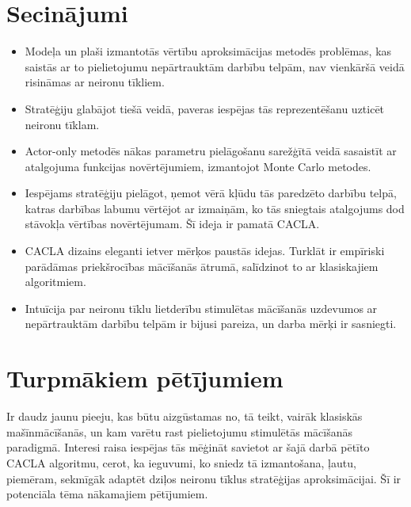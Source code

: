 \documentclass[a0,landscape]{a0poster}
\numberwithin{equation}{section}
\theoremstyle{definition}
\theoremstyle{plain}
\begin{document}
\begin{multicols}{4}
\color{SaddleBrown} %

\section*{Secinājumi}

\begin{itemize}
	\item Modeļa un plaši izmantotās vērtību aproksimācijas metodēs problēmas, kas saistās ar to pielietojumu nepārtrauktām darbību telpām, nav vienkāršā veidā risināmas ar neironu tīkliem.
	\item Stratēģiju glabājot tiešā veidā, paveras iespējas tās reprezentēšanu uzticēt neironu tīklam.
	\item Actor-only metodēs nākas parametru pielāgošanu sarežģītā veidā sasaistīt ar atalgojuma funkcijas novērtējumiem, izmantojot Monte Carlo metodes.
	\item Iespējams stratēģiju pielāgot, ņemot vērā kļūdu tās paredzēto darbību telpā, katras darbības labumu vērtējot ar izmaiņām, ko tās sniegtais atalgojums dod stāvokļa vērtības novērtējumam. Šī ideja ir pamatā CACLA.
	\item CACLA dizains eleganti ietver mērķos paustās idejas. Turklāt ir empīriski parādāmas priekšrocības mācīšanās ātrumā, salīdzinot to ar klasiskajiem algoritmiem.
	\item Intuīcija par neironu tīklu lietderību stimulētas mācīšanās uzdevumos ar nepārtrauktām darbību telpām ir bijusi pareiza, un darba mērķi ir sasniegti.
\end{itemize}

\color{DarkSlateGray} %


\section*{Turpmākiem pētījumiem}

Ir daudz jaunu pieeju, kas būtu aizgūstamas no, tā teikt, vairāk klasiskās mašīnmācīšanās, un kam varētu rast pielietojumu stimulētās mācīšanās paradigmā.
Interesi raisa iespējas tās mēģināt savietot ar šajā darbā pētīto CACLA algoritmu, cerot, ka ieguvumi, ko sniedz tā izmantošana, ļautu, piemēram, sekmīgāk adaptēt dziļos neironu tīklus stratēģijas aproksimācijai.
Šī ir potenciāla tēma nākamajiem pētījumiem.


\end{multicols}
\end{document}
